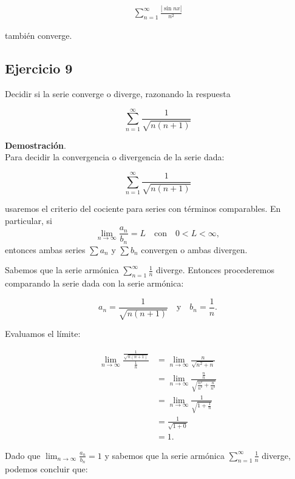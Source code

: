 \documentclass{article}
\begin{document}
    \begin{align*}
    \sum_{n=1}^{\infty} \frac{|\sin n x|}{n^{2}}
    \end{align*}

    también converge.

    \subsection*{Ejercicio 9}

    Decidir si la serie converge o diverge, razonando la respuesta

    $$
    \sum_{n=1}^{\infty} \frac{1}{\sqrt{n(n+1)}}
    $$

    \textbf{Demostración}.\\

    Para decidir la convergencia o divergencia de la serie dada:

    $$
    \sum_{n=1}^{\infty} \frac{1}{\sqrt{n(n+1)}}
    $$

    usaremos el criterio del cociente para series con términos comparables. En particular, si
    \[
    \lim _{n \rightarrow \infty} \frac{a_{n}}{b_{n}}=L \quad \text{con} \quad 0 < L < \infty,
    \]
    entonces ambas series \(\sum a_n\) y \(\sum b_n\) convergen o ambas divergen.

    Sabemos que la serie armónica \(\sum_{n=1}^{\infty} \frac{1}{n}\) diverge. Entonces procederemos comparando la serie dada con la serie armónica:

    \[
    a_n = \frac{1}{\sqrt{n(n+1)}} \quad \text{y} \quad b_n = \frac{1}{n}.
    \]

    Evaluamos el límite:

    \begin{align*}
    \lim _{n \rightarrow \infty} \frac{\frac{1}{\sqrt{n(n+1)}}}{\frac{1}{n}} &= \lim _{n \rightarrow \infty} \frac{n}{\sqrt{n^2 + n}} \\
    &= \lim _{n \rightarrow \infty} \frac{\frac{n}{n}}{\sqrt{\frac{n^2}{n^2} + \frac{n}{n^2}}} \\
    &= \lim _{n \rightarrow \infty} \frac{1}{\sqrt{1 + \frac{1}{n}}} \\
    &= \frac{1}{\sqrt{1 + 0}} \\
    &= 1.
    \end{align*}

    Dado que \(\lim _{n \rightarrow \infty} \frac{a_n}{b_n} = 1\) y sabemos que la serie armónica \(\sum_{n=1}^{\infty} \frac{1}{n}\) diverge, podemos concluir que:
\end{document}
